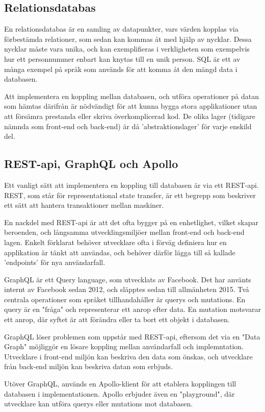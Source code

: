\subsection{Relationsdatabas}
En relationsdatabas är en samling av datapunkter, vars värden kopplas via förbestämda relationer, som sedan kan kommas åt med hjälp av nycklar. Dessa nycklar måste vara unika, och kan exemplifieras i verkligheten som exempelvis hur ett personnummer enbart kan knytas till en unik person. SQL är ett av många exempel på språk som används för att komma åt den mängd data i databasen.

Att implementera en koppling mellan databasen, och utföra operationer på datan som hämtas därifrån är nödvändigt för att kunna bygga stora applikationer utan att försämra prestanda eller skriva överkomplicerad kod. De olika lager (tidigare nämnda som front-end och back-end) är då 'abstraktionslager' för varje enskild del.

\subsection{REST-api, GraphQL och Apollo}
Ett vanligt sätt att implementera en koppling till databasen är via ett REST-api. REST, som står för representational state transfer, är ett begrepp som beskriver ett sätt att hantera transaktioner mellan maskiner.

En nackdel med REST-api är att det ofta bygger på en enhetlighet, vilket skapar beroenden, och långsamma utvecklingsmiljöer mellan front-end och back-end lagen. Enkelt förklarat behöver utvecklare ofta i förväg definiera hur en applikation är tänkt att användas, och behöver därför lägga till så kallade 'endpoints' för nya användarfall.

GraphQL är ett Query language, som utvecklats av Facebook. Det har använts internt av Facebook sedan 2012, och släpptes sedan till allmänheten 2015. Två centrala operationer som språket tillhandahåller är querys och mutations. En query är en "fråga" och representerar ett anrop efter data. En mutation motsvarar ett anrop, där syftet är att förändra eller ta bort ett objekt i databasen. 

GraphQL löser problemen som uppstår med REST-api, eftersom det via en "Data Graph" möjliggör en lösare koppling mellan användarfall och implemntation. Utvecklare i front-end miljön kan beskriva den data som önskas, och utvecklare från back-end miljön kan beskriva datan som erbjuds. 

Utöver GraphQL, används en Apollo-klient för att etablera kopplingen till databasen i implementationen. Apollo erbjuder även en "playground", där utvecklare kan utföra querys eller mutations mot databasen.

